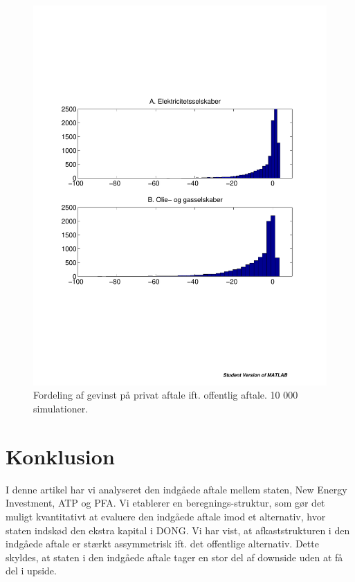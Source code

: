 \documentclass{article}
\begin{document}
\begin{figure}
\includegraphics[scale=0.8]{../matlab/figs/sim_return.pdf}
\caption{Fordeling af gevinst på privat aftale ift. offentlig aftale. 10 000 simulationer. }
\label{fig:sim}
\end{figure}




\section{Konklusion}

I denne artikel har vi analyseret den indgåede aftale mellem staten, New Energy Investment, ATP og PFA. Vi etablerer en beregnings-struktur, som gør det muligt kvantitativt at evaluere den indgåede aftale imod et alternativ, hvor staten indskød den ekstra kapital i DONG. Vi har vist, at afkaststrukturen i den indgåede aftale er stærkt assymmetrisk ift. det offentlige alternativ. Dette skyldes, at staten i den indgåede aftale tager en stor del af downside uden at få del i upside. 
\end{document}
